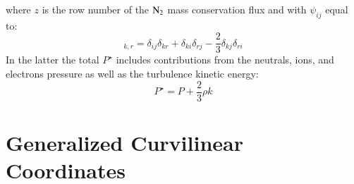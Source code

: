 \documentclass{warpdoc}
\begin{document}
%
where $z$ is the row number of the $\rm N_2$ mass conservation flux and with $\psi_{ij}$ equal to:
%
\begin{equation}
[\psi_{ij}]_{k,r}=\delta_{ij}\delta_{kr}+\delta_{ki}\delta_{rj}-\frac{2}{3}\delta_{kj}\delta_{ri}
\end{equation}
%
In the latter the total $P^\star$ includes contributions from the neutrals, ions, and electrons pressure as well as the turbulence kinetic energy:
%
\begin{equation}
P^\star
=P  + \frac{2}{3} \rho k
\end{equation}
%
 

\section{Generalized Curvilinear Coordinates}
\end{document}

